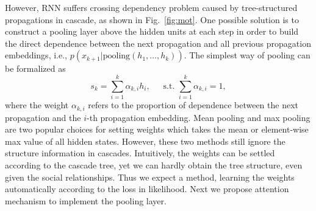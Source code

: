 
However, RNN suffers crossing dependency problem caused by tree-structured
propagations in cascade, as shown in Fig.~\ref{fig:mot}. One possible
solution is to construct a pooling layer above the hidden
units at each step in order to build the direct dependence between the
next propagation and all previous propagation embeddings,
i.e., $p(x_{k+1} | \text{pooling}(h_1,\ldots,h_k))$. The simplest way of pooling can
be formalized as
\begin{equation}
\label{eq:pooling_frame}
s_k=\sum_{i=1}^k \alpha_{k,i} h_i \text{,~~~~~s.t.~} \sum_{i=1}^k
\alpha_{k,i}=1,
\end{equation}
where the weight $\alpha_{k,i}$ refers to the proportion of dependence between
the next propagation and the $i$-th propagation embedding. Mean pooling and max
pooling are two popular choices for setting weights which takes the mean or element-wise
max value of all hidden states. However, these two methods still ignore the
structure information in cascades.
Intuitively, the weights can be settled according to the cascade tree, yet we
can hardly obtain the tree structure, even given the social relationships. Thus
we expect a method, learning the weights automatically according to the 
loss in likelihood. Next we propose attention mechanism to implement the pooling
layer.

